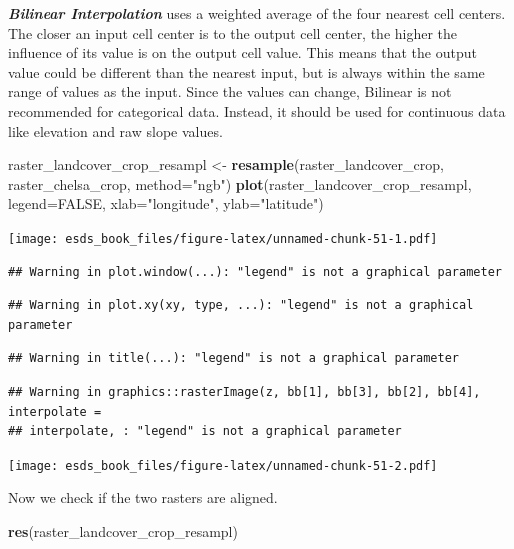\documentclass[
]{book}
\newenvironment{Shaded}{\begin{snugshade}}{\end{snugshade}}
\newcommand{\DataTypeTok}[1]{\textcolor[rgb]{0.13,0.29,0.53}{#1}}
\newcommand{\KeywordTok}[1]{\textcolor[rgb]{0.13,0.29,0.53}{\textbf{#1}}}
\newcommand{\NormalTok}[1]{#1}
\newcommand{\OtherTok}[1]{\textcolor[rgb]{0.56,0.35,0.01}{#1}}
\newcommand{\StringTok}[1]{\textcolor[rgb]{0.31,0.60,0.02}{#1}}
\begin{document}
\textbf{\emph{Bilinear Interpolation}} uses a weighted average of the four nearest cell centers. The closer an input cell center is to the output cell center, the higher the influence of its value is on the output cell value. This means that the output value could be different than the nearest input, but is always within the same range of values as the input. Since the values can change, Bilinear is not recommended for categorical data. Instead, it should be used for continuous data like elevation and raw slope values.

\begin{Shaded}
\begin{Highlighting}[]
\NormalTok{raster_landcover_crop_resampl <-}\StringTok{ }\KeywordTok{resample}\NormalTok{(raster_landcover_crop, raster_chelsa_crop, }\DataTypeTok{method=}\StringTok{"ngb"}\NormalTok{)}
\KeywordTok{plot}\NormalTok{(raster_landcover_crop_resampl, }\DataTypeTok{legend=}\OtherTok{FALSE}\NormalTok{, }\DataTypeTok{xlab=}\StringTok{"longitude"}\NormalTok{, }\DataTypeTok{ylab=}\StringTok{"latitude"}\NormalTok{)}
\end{Highlighting}
\end{Shaded}

\texttt{[image: esds\_book\_files/figure-latex/unnamed-chunk-51-1.pdf]}

\begin{verbatim}
## Warning in plot.window(...): "legend" is not a graphical parameter
\end{verbatim}

\begin{verbatim}
## Warning in plot.xy(xy, type, ...): "legend" is not a graphical parameter
\end{verbatim}

\begin{verbatim}
## Warning in title(...): "legend" is not a graphical parameter
\end{verbatim}

\begin{verbatim}
## Warning in graphics::rasterImage(z, bb[1], bb[3], bb[2], bb[4], interpolate =
## interpolate, : "legend" is not a graphical parameter
\end{verbatim}

\texttt{[image: esds\_book\_files/figure-latex/unnamed-chunk-51-2.pdf]}

Now we check if the two rasters are aligned.

\begin{Shaded}
\begin{Highlighting}[]
\KeywordTok{res}\NormalTok{(raster_landcover_crop_resampl)}
\end{Highlighting}
\end{Shaded}
\end{document}
